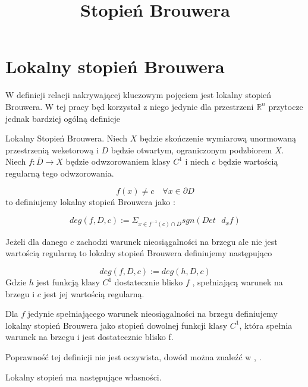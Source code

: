 \title{Stopień Brouwera}

\section{Lokalny stopień Brouwera}

W definicji relacji nakrywającej kluczowym pojęciem jest lokalny stopień Brouwera.
W tej pracy będ korzystał z niego jedynie dla przestrzeni $ \mathbb R^n $ 
przytocze jednak bardziej ogólną definicje

\begin{definition} {Lokalny Stopień Brouwera.}
  Niech $X$ będzie skończenie wymiarową unormowaną przestrzenią weketorową i $ D $ będzie otwartym, ograniczonym podzbiorem $ X $.
  Niech $ f : \overline D \to X $ będzie odwzorowaniem klasy $ C^1 $ i niech $c$ będzie wartością regularną tego odwzorowania. 
  
  \begin{equation}
    f(x) \neq c  \quad \forall x \in \partial D 
  \end{equation}
to definiujemy lokalny stopień Brouwera jako : 
  
  \begin{equation}
    deg(f,D,c) := \Sigma_{x \in f^{-1}(c)\cap D} sgn(Det \mbox{ } d_x f)
  \end{equation}
  
  Jeżeli dla danego $ c $ zachodzi warunek nieosiągalności na brzegu ale nie jest wartością regularną to lokalny stopień Brouwera
  definiujemy następująco
  
    \begin{equation}
      deg(f,D,c) := deg(h,D,c)
    \end{equation}
    Gdzie $h$ jest funkcją klasy $ C^1 $ dostatecznie blisko $f$ , spełniającą warunek na brzegu i $ c $ jest jej wartością regularną.
    
    Dla $ f $ jedynie spełniającego warunek nieosiągalności na brzegu definiujemy lokalny stopień Brouwera jako stopień 
    dowolnej funkcji klasy $ C^1 $, która spełnia warunek na brzegu i jest dostatecznie blisko f.
  

\end{definition}

Poprawność tej definicji nie jest oczywista, dowód można znaleźć w \cite{N} , \cite{Sch}.

Lokalny stopień ma następujące własności.

